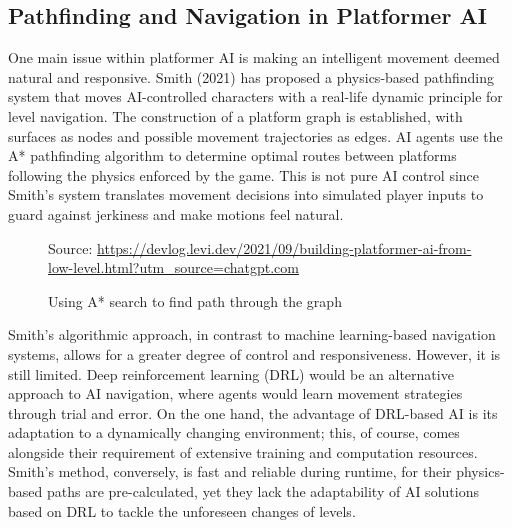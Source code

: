 \documentclass[12pt,oneside,openright,a4paper]{cpe-english-project}
\begin{document}
\subsection{Pathfinding and Navigation in Platformer AI}
One main issue within platformer AI is making an intelligent movement deemed natural and responsive. Smith (2021)\cite{physics_pathfinding} has proposed a physics-based pathfinding system that moves AI-controlled characters with a real-life dynamic principle for level navigation. The construction of a platform graph is established, with surfaces as nodes and possible movement trajectories as edges. AI agents use the A* pathfinding algorithm to determine optimal routes between platforms following the physics enforced by the game. This is not pure AI control since Smith's system translates movement decisions into simulated player inputs to guard against jerkiness and make motions feel natural.\par
\begin{figure}[!h]
\centering
{}
\caption{Using A* search to find path through the graph}\label{fig:A*tofindPath}
Source:
\href{https://devlog.levi.dev/2021/09/building-platformer-ai-from-low-level.html?utm\_source=chatgpt.com}{https://devlog.levi.dev/2021/09/building-platformer-ai-from-low-level.html?utm\_source=chatgpt.com}  
\end{figure}
Smith's algorithmic approach, in contrast to machine learning-based navigation systems, allows for a greater degree of control and responsiveness. However, it is still limited. Deep reinforcement learning (DRL) would be an alternative approach to AI navigation, where agents would learn movement strategies through trial and error. On the one hand, the advantage of DRL-based AI is its adaptation to a dynamically changing environment; this, of course, comes alongside their requirement of extensive training and computation resources. Smith's method, conversely, is fast and reliable during runtime, for their physics-based paths are pre-calculated, yet they lack the adaptability of AI solutions based on DRL to tackle the unforeseen changes of levels.\par
\newpage
\end{document}

